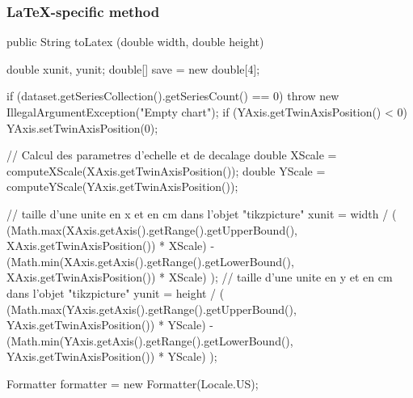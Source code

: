 \subsubsection*{\LaTeX-specific method}

\begin{code}

   public String toLatex (double width, double height) \begin{hide} {
      double xunit, yunit;
      double[] save = new double[4];

      if (dataset.getSeriesCollection().getSeriesCount() == 0)
         throw new IllegalArgumentException("Empty chart");
      if (YAxis.getTwinAxisPosition() < 0)
         YAxis.setTwinAxisPosition(0);

      // Calcul des parametres d'echelle et de decalage
      double XScale = computeXScale(XAxis.getTwinAxisPosition());
      double YScale = computeYScale(YAxis.getTwinAxisPosition());

      // taille d'une unite en x et en cm dans l'objet "tikzpicture"
      xunit = width / ( (Math.max(XAxis.getAxis().getRange().getUpperBound(), XAxis.getTwinAxisPosition()) * XScale) - (Math.min(XAxis.getAxis().getRange().getLowerBound(), XAxis.getTwinAxisPosition()) * XScale) );
      // taille d'une unite en y et en cm dans l'objet "tikzpicture"
     yunit = height / ( (Math.max(YAxis.getAxis().getRange().getUpperBound(), YAxis.getTwinAxisPosition()) * YScale) - (Math.min(YAxis.getAxis().getRange().getLowerBound(), YAxis.getTwinAxisPosition()) * YScale) );

      Formatter formatter = new Formatter(Locale.US);

}
\end{hide}
\end{code}
